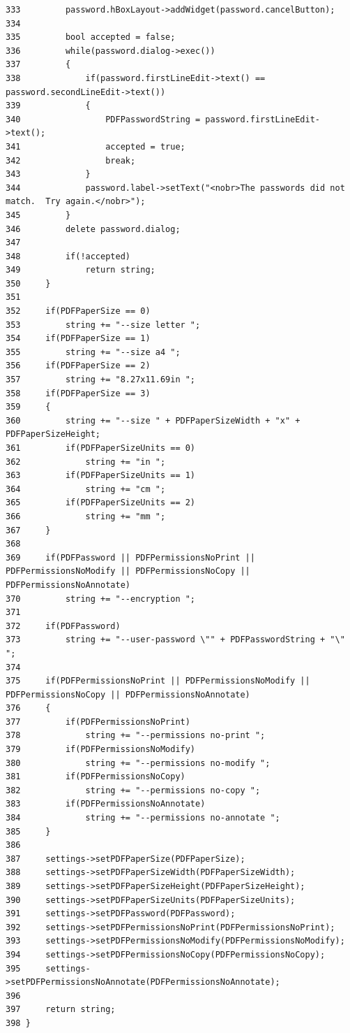 \begin{verbatim}
333         password.hBoxLayout->addWidget(password.cancelButton);
334 
335         bool accepted = false;
336         while(password.dialog->exec())
337         {
338             if(password.firstLineEdit->text() == password.secondLineEdit->text())
339             {
340                 PDFPasswordString = password.firstLineEdit->text();
341                 accepted = true;
342                 break;
343             }
344             password.label->setText("<nobr>The passwords did not match.  Try again.</nobr>");
345         }
346         delete password.dialog;
347 
348         if(!accepted)
349             return string;
350     }
351 
352     if(PDFPaperSize == 0)
353         string += "--size letter ";
354     if(PDFPaperSize == 1)
355         string += "--size a4 ";
356     if(PDFPaperSize == 2)
357         string += "8.27x11.69in ";
358     if(PDFPaperSize == 3)
359     {
360         string += "--size " + PDFPaperSizeWidth + "x" + PDFPaperSizeHeight;
361         if(PDFPaperSizeUnits == 0)
362             string += "in ";
363         if(PDFPaperSizeUnits == 1)
364             string += "cm ";
365         if(PDFPaperSizeUnits == 2)
366             string += "mm ";
367     }
368 
369     if(PDFPassword || PDFPermissionsNoPrint || PDFPermissionsNoModify || PDFPermissionsNoCopy || PDFPermissionsNoAnnotate)
370         string += "--encryption ";
371 
372     if(PDFPassword)
373         string += "--user-password \"" + PDFPasswordString + "\" ";
374 
375     if(PDFPermissionsNoPrint || PDFPermissionsNoModify || PDFPermissionsNoCopy || PDFPermissionsNoAnnotate)
376     {
377         if(PDFPermissionsNoPrint)
378             string += "--permissions no-print ";
379         if(PDFPermissionsNoModify)
380             string += "--permissions no-modify ";
381         if(PDFPermissionsNoCopy)
382             string += "--permissions no-copy ";
383         if(PDFPermissionsNoAnnotate)
384             string += "--permissions no-annotate ";
385     }
386 
387     settings->setPDFPaperSize(PDFPaperSize);
388     settings->setPDFPaperSizeWidth(PDFPaperSizeWidth);
389     settings->setPDFPaperSizeHeight(PDFPaperSizeHeight);
390     settings->setPDFPaperSizeUnits(PDFPaperSizeUnits);
391     settings->setPDFPassword(PDFPassword);
392     settings->setPDFPermissionsNoPrint(PDFPermissionsNoPrint);
393     settings->setPDFPermissionsNoModify(PDFPermissionsNoModify);
394     settings->setPDFPermissionsNoCopy(PDFPermissionsNoCopy);
395     settings->setPDFPermissionsNoAnnotate(PDFPermissionsNoAnnotate);
396 
397     return string;
398 }
\end{verbatim}\normalsize 



